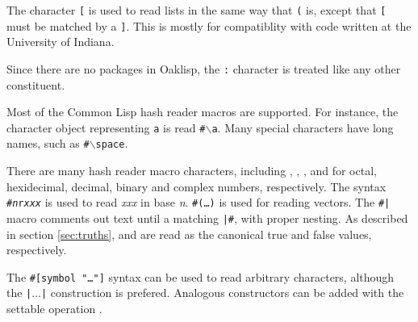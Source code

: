 
The character \texttt{[} is used to read lists in the same way that
\texttt{(} is, except that \texttt{[} must be matched by a \texttt{]}.
This is mostly for compatiblity with code written at the University of
Indiana.

Since there are no packages in Oaklisp, the \texttt{:} character is
treated like any other constituent.

Most of the Common Lisp hash reader macros are supported.  For
instance, the character object representing \texttt{a} is read
\texttt{\#$\backslash$a}.  Many special characters have long names, such as
\texttt{\#$\backslash$space}.


There are many hash reader macro characters, including ,
, ,  and  for octal, hexidecimal,
decimal, binary and complex numbers, respectively.  The syntax
\texttt{\#\emph{n}r\emph{xxx}} is used to read \emph{xxx} in base \emph{n}.
\texttt{\#(\ldots)} is used for reading vectors.  The \texttt{\#|} macro
comments out text until a matching \texttt{|\#}, with proper nesting.  As
described in section \ref{sec:truths},  and  are read
as the canonical true and false values, respectively.

The \texttt{\#[symbol "\ldots"]} syntax can be used to read arbitrary
characters, although the \texttt{|$\ldots$|} construction is prefered.
Analogous constructors can be added with the settable operation
.




